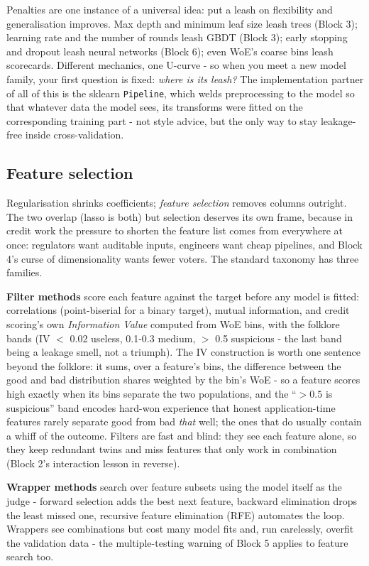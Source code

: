 \documentclass[11pt,a4paper]{article}
\begin{document}
Penalties are one instance of a universal idea: put a leash on flexibility
and generalisation improves. Max depth and minimum leaf size leash trees
(Block 3); learning rate and the number of rounds leash GBDT (Block 3);
early stopping and dropout leash neural networks (Block 6); even WoE's
coarse bins leash scorecards. Different mechanics, one U-curve - so when
you meet a new model family, your first question is fixed: \emph{where is
its leash?} The implementation partner of all of this is the sklearn
\texttt{Pipeline}, which welds preprocessing to the model so that whatever
data the model sees, its transforms were fitted on the corresponding
training part - not style advice, but the only way to stay leakage-free
inside cross-validation.

\subsection{Feature selection}
Regularisation shrinks coefficients; \emph{feature selection} removes
columns outright. The two overlap (lasso is both) but selection deserves
its own frame, because in credit work the pressure to shorten the feature
list comes from everywhere at once: regulators want auditable inputs,
engineers want cheap pipelines, and Block 4's curse of dimensionality
wants fewer voters. The standard taxonomy has three families.

\textbf{Filter methods} score each feature against the target before any
model is fitted: correlations (point-biserial for a binary target),
mutual information, and credit scoring's own \emph{Information Value}
computed from WoE bins, with the folklore bands (IV $<$ 0.02 useless,
0.1-0.3 medium, $>$ 0.5 suspicious - the last band being a leakage
smell, not a triumph). The IV construction is worth one sentence beyond
the folklore: it sums, over a feature's bins, the difference between the
good and bad distribution shares weighted by the bin's WoE - so a
feature scores high exactly when its bins separate the two populations,
and the ``$> 0.5$ is suspicious'' band encodes hard-won experience that
honest application-time features rarely separate good from bad
\emph{that} well; the ones that do usually contain a whiff of the
outcome. Filters are fast and blind: they see each feature
alone, so they keep redundant twins and miss features that only work in
combination (Block 2's interaction lesson in reverse).

\textbf{Wrapper methods} search over feature subsets using the model
itself as the judge - forward selection adds the best next feature,
backward elimination drops the least missed one, recursive feature
elimination (RFE) automates the loop. Wrappers see combinations but cost
many model fits and, run carelessly, overfit the validation data - the
multiple-testing warning of Block 5 applies to feature search too.
\end{document}
